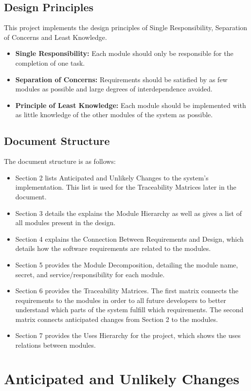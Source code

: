 \documentclass[12pt, titlepage]{article}
\begin{document}
\subsection{Design Principles}
This project implements the design principles of Single Responsibility, Separation of Concerns and Least Knowledge.
\begin{itemize}
\item \textbf{Single Responsibility:} Each module should only be responsible for the completion of one task.
\item \textbf{Separation of Concerns:} Requirements should be satisfied by as few modules as possible and large degrees of interdependence avoided. 
\item \textbf{Principle of Least Knowledge:} Each module should be implemented with as little knowledge of the other modules of the system as possible.
\end{itemize}

\subsection{Document Structure}
The document structure is as follows:
\begin{itemize}
\item Section 2 lists Anticipated and Unlikely Changes to the system’s implementation. This list is used for the Traceability Matrices later in the document.
\item Section 3 details the explains the Module Hierarchy as well as gives a list of all modules present in the design. 
\item Section 4 explains the Connection Between Requirements and Design, which details how the software requirements are related to the modules.
\item Section 5 provides the Module Decomposition, detailing the module name, secret, and service/responsibility for each module.
\item Section 6 provides the Traceability Matrices. The first matrix connects the requirements to the modules in order to all future developers to better understand which parts of the system fulfill which requirements. The second matrix connects anticipated changes from Section 2 to the modules.
\item Section 7 provides the Uses Hierarchy for the project, which shows the uses relations between modules.
\end{itemize}

\section{Anticipated and Unlikely Changes} \label{SecChange}
\end{document}
